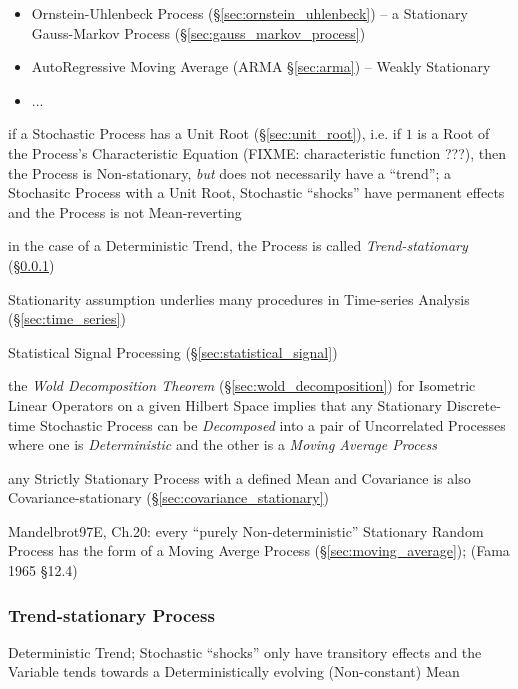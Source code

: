 \begin{itemize}
  \item Ornstein-Uhlenbeck Process (\S\ref{sec:ornstein_uhlenbeck}) -- a
    Stationary Gauss-Markov Process (\S\ref{sec:gauss_markov_process})
  \item AutoRegressive Moving Average (ARMA \S\ref{sec:arma}) -- Weakly
    Stationary
  \item ...
\end{itemize}

if a Stochastic Process has a Unit Root (\S\ref{sec:unit_root}), i.e. if $1$ is
a Root of the Process's Characteristic Equation (FIXME: characteristic function
???), then the Process is Non-stationary, \emph{but} does not necessarily have a
``trend''; a Stochasitc Process with a Unit Root, Stochastic ``shocks'' have
permanent effects and the Process is not Mean-reverting

in the case of a Deterministic Trend, the Process is called
\emph{Trend-stationary} (\S\ref{sec:trend_stationary})

\fist Stationarity assumption underlies many procedures in Time-series Analysis
(\S\ref{sec:time_series})

\fist Statistical Signal Processing (\S\ref{sec:statistical_signal})

the \emph{Wold Decomposition Theorem} (\S\ref{sec:wold_decomposition}) for
Isometric Linear Operators on a given Hilbert Space implies that any Stationary
Discrete-time Stochastic Process can be \emph{Decomposed} into a pair of
Uncorrelated Processes where one is \emph{Deterministic} and the other is a
\emph{Moving Average Process}

any Strictly Stationary Process with a defined Mean and Covariance is also
Covariance-stationary (\S\ref{sec:covariance_stationary})

Mandelbrot97E, Ch.20: every ``purely Non-deterministic'' Stationary Random
Process has the form of a Moving Averge Process (\S\ref{sec:moving_average});
(Fama 1965 \S 12.4)



\subsubsection{Trend-stationary Process}\label{sec:trend_stationary}

Deterministic Trend; Stochastic ``shocks'' only have transitory effects and the
Variable tends towards a Deterministically evolving (Non-constant) Mean

